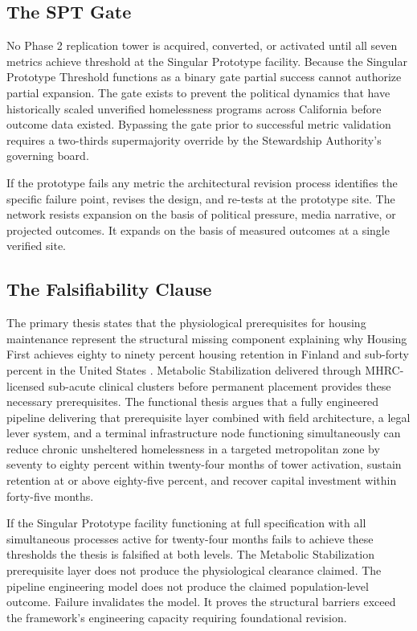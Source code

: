 \documentclass[12pt, letterpaper]{article}
\begin{document}
\subsection{The SPT Gate}

No Phase 2 replication tower is acquired, converted, or activated until all seven metrics achieve threshold at the Singular Prototype facility. Because the Singular Prototype Threshold functions as a binary gate partial success cannot authorize partial expansion. The gate exists to prevent the political dynamics that have historically scaled unverified homelessness programs across California before outcome data existed. Bypassing the gate prior to successful metric validation requires a two-thirds supermajority override by the Stewardship Authority's governing board.

If the prototype fails any metric the architectural revision process identifies the specific failure point, revises the design, and re-tests at the prototype site. The network resists expansion on the basis of political pressure, media narrative, or projected outcomes. It expands on the basis of measured outcomes at a single verified site.

\subsection{The Falsifiability Clause}

The primary thesis states that the physiological prerequisites for housing maintenance represent the structural missing component explaining why Housing First achieves eighty to ninety percent housing retention in Finland and sub-forty percent in the United States \citep{ucsf_bhhi_2023}. Metabolic Stabilization delivered through MHRC-licensed sub-acute clinical clusters before permanent placement provides these necessary prerequisites. The functional thesis argues that a fully engineered pipeline delivering that prerequisite layer combined with field architecture, a legal lever system, and a terminal infrastructure node functioning simultaneously can reduce chronic unsheltered homelessness in a targeted metropolitan zone by seventy to eighty percent within twenty-four months of tower activation, sustain retention at or above eighty-five percent, and recover capital investment within forty-five months.

If the Singular Prototype facility functioning at full specification with all simultaneous processes active for twenty-four months fails to achieve these thresholds the thesis is falsified at both levels. The Metabolic Stabilization prerequisite layer does not produce the physiological clearance claimed. The pipeline engineering model does not produce the claimed population-level outcome. Failure invalidates the model. It proves the structural barriers exceed the framework's engineering capacity requiring foundational revision.
\end{document}
